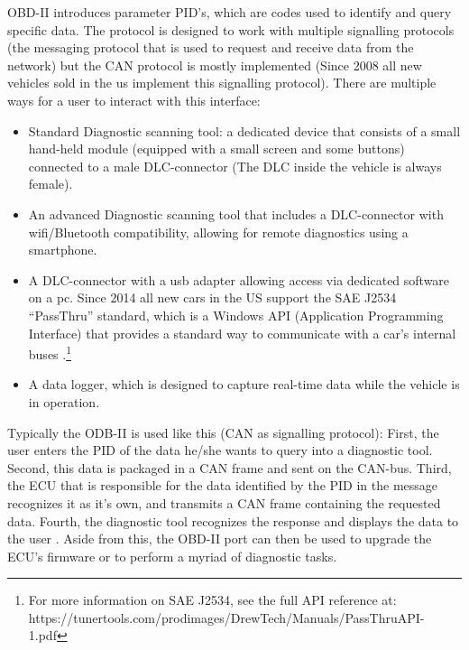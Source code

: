 \documentclass[11pt]{article}
\begin{document}
 OBD-II introduces parameter PID's, which are codes used to identify and query specific data. The protocol is designed to work with multiple signalling protocols (the messaging protocol that is used to request and receive data from the network) but the CAN protocol is mostly implemented (Since 2008 all new vehicles sold in the us implement this signalling protocol\cite{OBDconnector}). \newline
\newline
There are multiple ways for a user to interact with this interface:
\begin{itemize}
	\item Standard Diagnostic scanning tool: a dedicated device that consists of a small hand-held module (equipped with a small screen and some buttons) connected to a male DLC-connector (The DLC inside the vehicle is always female).
	
	\item An advanced Diagnostic scanning tool that includes a DLC-connector with wifi/Bluetooth compatibility, allowing for remote diagnostics using a smartphone.
	
	\item A DLC-connector with a usb adapter allowing access via dedicated software on a pc. Since 2014 all new cars in the US support the SAE J2534 “PassThru” standard, which is a Windows API (Application Programming Interface) that provides a standard way to communicate with a car’s internal buses \cite{Checkoway}.\footnote{For more information on SAE J2534, see the full API reference at: https://tunertools.com/prodimages/DrewTech/Manuals/PassThru\textunderscore API-1.pdf}
	
	\item A data logger, which is designed to capture real-time data while the vehicle is in operation.
\end{itemize}

Typically the ODB-II is used like this (CAN as signalling protocol): First, the user enters the PID of the data he/she wants to query into a diagnostic tool. Second, this data is packaged in a CAN frame and sent on the CAN-bus. Third, the ECU that is responsible for the data identified by the PID in the message recognizes it as it's own, and transmits a CAN frame containing the requested data. Fourth, the diagnostic tool recognizes the response and displays the data to the user \cite{PIDwiki}. Aside from this, the OBD-II port can then be used to upgrade the ECU's firmware or to perform a myriad of diagnostic tasks\cite{Checkoway}.
\end{document}
